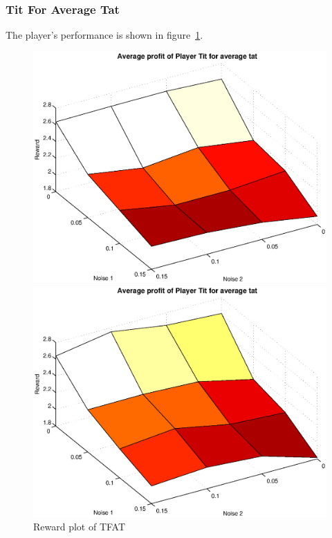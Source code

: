 \subsubsection{Tit For Average Tat}
The player's performance is shown in figure~\ref{pic player tfat}.\\
\begin{figure}[h]
	\caption{Reward plot of TFAT}
	\label{pic player tfat}
\begin{minipage}[hbt]{0.65\textwidth}
	\centering
	\includegraphics[width=\textwidth]{pics/simulation1/Reward_vs_Noise_of_Player_Tit_for_average_tat}
\end{minipage}
\hfill
\begin{minipage}[hbt]{0.3\textwidth}
	\centering
	\includegraphics[width=\textwidth]{pics/simulation2/Reward_vs_Noise_of_Player_Tit_for_average_tat}
\end{minipage}

\end{figure}

